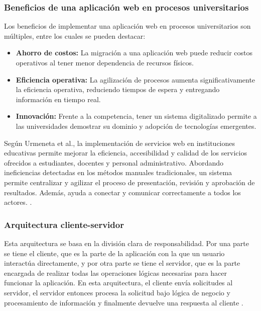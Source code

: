         \subsubsection{Beneficios de una aplicación web en procesos universitarios}
        Los beneficios de implementar una aplicación web en procesos universitarios son múltiples, entre los cuales se 
        pueden destacar:
        \begin{itemize}
            \item \textbf{Ahorro de costos:} La migración a una aplicación web puede reducir costos operativos al tener 
            menor dependencia de recursos físicos.
            \item \textbf{Eficiencia operativa:} La agilización de procesos aumenta significativamente la eficiencia
            operativa, reduciendo tiempos de espera y entregando información en tiempo real.
            \item \textbf{Innovación:} Frente a la competencia, tener un sistema digitalizado permite a las universidades
            demostrar su dominio y adopción de tecnologías emergentes.
        \end{itemize}
        Según Urmeneta et al., la implementación de servicios web en instituciones educativas permite mejorar la eficiencia,
        accesibilidad y calidad de los servicios ofrecidos a estudiantes, docentes y personal administrativo. Abordando 
        ineficiencias detectadas en los métodos manuales tradicionales, un sistema permite centralizar y agilizar el proceso 
        de presentación, revisión y aprobación de resultados. Además, ayuda a conectar y comunicar correctamente a todos los 
        actores. \cite{urmeneta2025design}.

        \subsubsection{Arquitectura cliente-servidor}
        Esta arquitectura se basa en la división clara de responsabilidad. Por una parte se tiene el cliente, que es la parte
        de la aplicación con la que un usuario interactúa directamente, y por otra parte se tiene el servidor, que es la parte
        encargada de realizar todas las operaciones lógicas necesarias para hacer funcionar la aplicación.
        En esta arquitectura, el cliente envía solicitudes al servidor, el servidor entonces procesa la solicitud bajo lógica
        de negocio y procesamiento de información y finalmente devuelve una respuesta al cliente
        \cite{pardo2018comparacion,urmeneta2025design}.

